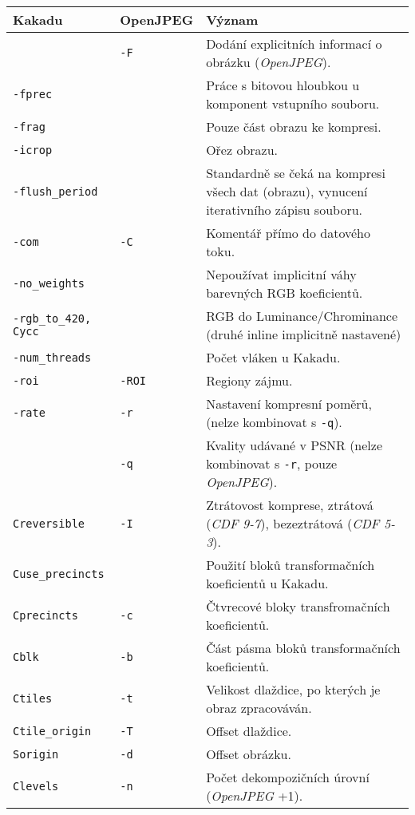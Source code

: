 \begin{center}
		\setlength{\tabcolsep}{5pt} %
		\renewcommand{\arraystretch}{1.25} %
			\footnotesize
			\begin{tabular}{|p{3cm}|p{2cm}|p{9cm}|}
			\hline
			\textbf{Kakadu} & \textbf{OpenJPEG} & \textbf{Význam} \\ 
			\hline

			& \texttt{-F} & Dodání explicitních informací o obrázku (\textit{OpenJPEG}).\\ 
			 \texttt{-fprec} & & Práce s bitovou hloubkou u komponent vstupního souboru. \\
			 \texttt{-frag} & & Pouze část obrazu ke kompresi. \\
			 \texttt{-icrop} & & Ořez obrazu. \\
			 \texttt{-flush\_period} & & Standardně se čeká na kompresi všech dat (obrazu), vynucení iterativního zápisu souboru. \\
			 \texttt{-com} & \texttt{-C} & Komentář přímo do datového toku. \\
			 \texttt{-no\_weights} & & Nepoužívat implicitní váhy barevných RGB koeficientů. \\
			
			 \texttt{-rgb\_to\_420, Cycc} & & RGB do Luminance/Chrominance (druhé inline implicitně nastavené) \\ 
			 \texttt{-num\_threads} & & Počet vláken u Kakadu. \\ 
			 \texttt{-roi} & \texttt{-ROI} & Regiony zájmu. \\ 

			 \texttt{-rate}  & \texttt{-r} & Nastavení kompresní poměrů, (nelze kombinovat s \texttt{-q}).\\ 
			  											    & \texttt{-q}  & Kvality udávané v PSNR (nelze kombinovat s \texttt{-r}, pouze \textit{OpenJPEG}).\\ 
			 \texttt{Creversible}& \texttt{-I} & Ztrátovost komprese, ztrátová (\textit{CDF 9-7}), bezeztrátová (\textit{CDF 5-3}).\\ 
			  
			 	
			 \hline
			 
			 \texttt{Cuse\_precincts} & & Použití bloků transformačních koeficientů u Kakadu.\\
			 \texttt{Cprecincts} & \texttt{-c} & Čtvrecové bloky transfromačních koeficientů.\\
			 \texttt{Cblk} & \texttt{-b} & Část pásma bloků transformačních koeficientů.\\
			 \texttt{Ctiles} & \texttt{-t} & Velikost dlaždice, po kterých je obraz zpracováván.\\ 	
			 \texttt{Ctile\_origin} & \texttt{-T} & Offset dlaždice.\\ 		
			 \texttt{Sorigin} & \texttt{-d} & Offset obrázku.\\ 							
			\texttt{Clevels} & \texttt{-n}  & Počet dekompozičních úrovní (\textit{OpenJPEG} +1).\\
			

\end{tabular}
\end{center}
